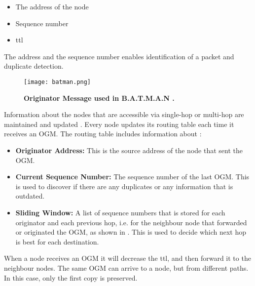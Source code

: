 \begin{itemize}
\item The address of the node
\item Sequence number
\item \gls{ttl} 
\end{itemize}

The address and the sequence number enables identification of a packet and duplicate detection. 

\begin{figure}[b]
  \centering
    \texttt{[image: batman.png]}
     \caption[Originator Message in B.A.T.M.A.N]{\textbf{Originator Message used in B.A.T.M.A.N \cite{batman2}.}}
\label{fig:batman} 
\end{figure}


Information about the nodes that are accessible via single-hop or multi-hop are maintained and updated \cite{batman}. Every node updates its routing table each time it receives an OGM. The routing table includes information about \cite{batman2}:

\begin{itemize}
  \item \textbf{Originator Address:} This is the source address of the node that sent the OGM.
  \item \textbf{Current Sequence Number:} The sequence number of the last OGM. This is used to discover if there are any duplicates or any information that is outdated.
  \item \textbf{Sliding Window:} A list of sequence numbers that is stored for each originator and each previous hop, i.e. for the neighbour node that forwarded or originated the OGM, as shown in . This is used to decide which next hop is best for each destination. 
\end{itemize}

When a node receives an OGM it will decrease the \gls{ttl}, and then forward it to the neighbour nodes. The same OGM can arrive to a node, but from different paths. In this case, only the first copy is preserved. 


